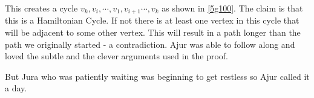 This creates a cycle $v_k,v_i,\cdots,v_1,v_{i+1}\cdots, v_k$ as shown in \ref{5g100}. The claim is that this is a Hamiltonian Cycle. If not there is at least one vertex in this cycle that will be adjacent to some other vertex. This will result in a path longer than the path we originally started - a contradiction.
Ajur was able to follow along and loved the subtle and the clever arguments used in the proof. 


But Jura who was patiently waiting was beginning to get restless so Ajur called it a day.
